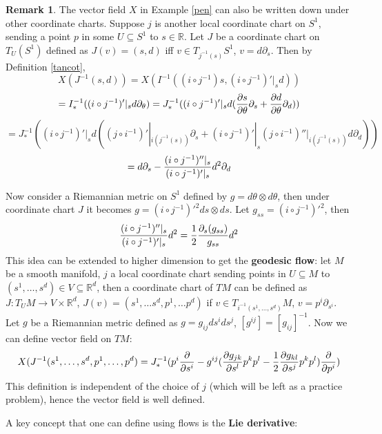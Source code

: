 \documentclass{article}
\theoremstyle{definition}
\newtheorem{rmk}[thm]{Remark}
\begin{document}
\begin{rmk}
    The vector field $X$ in Example \ref{pen} can also be written down under other coordinate charts. Suppose $j$ is another local coordinate chart on $S^1$, sending a point $p$ in some $U\subseteq S^1$ to $s\in \mathbb{R}$. Let $J$ be a coordinate chart on $T_U(S^1)$ defined as $J(v)=(s, d)$ iff $v\in T_{j^{-1}(s)}S^1$, $v=d\partial_s$. Then by Definition \ref{tancot},
    \[X(J^{-1}(s, d))=X(I^{-1}((i\circ j^{-1})s, (i\circ j^{-1})'|_s d))\]
    \[=I^{-1}_*((i\circ j^{-1})'|_s d\partial_\theta)=J^{-1}_*((i\circ j^{-1})'|_s d({\partial s\over\partial \theta}\partial_s+{\partial d\over\partial \theta}\partial_d))\]
    \[=J^{-1}_*((i\circ j^{-1})'|_s d((j\circ i^{-1})'|_{i(j^{-1}(s))}\partial_s+(i\circ j^{-1})'|_s (j\circ i^{-1})''|_{i(j^{-1}(s))}d\partial_d))\]
    \[=d\partial_s-{(i\circ j^{-1})''|_s\over (i\circ j^{-1})'|_s} d^2\partial_d\]

    Now consider a Riemannian metric on $S^1$ defined by $g=d\theta\otimes d\theta$, then under coordinate chart $J$ it becomes $g=(i\circ j^{-1})'^2 ds\otimes ds$. Let $g_{ss}=(i\circ j^{-1})'^2$, then 
    \[{(i\circ j^{-1})''|_s\over (i\circ j^{-1})'|_s} d^2={1\over 2}{\partial_s(g_{ss})\over g_{ss}}d^2\]
    This idea can be extended to higher dimension to get the {\bf geodesic flow}: let $M$ be a smooth manifold, $j$ a local coordinate chart sending points in $U\subseteq M$ to $(s^1, \dots, s^d)\in V\subseteq \mathbb{R}^d$, then a coordinate chart of $TM$ can be defined as $J: T_UM\rightarrow V\times\mathbb{R}^d$, $J(v)=(s^1, \dots s^d, p^1, \dots p^d)$ if $v\in T_{i^{-1}(s^1, \dots, s^d)}M$, $v=p^i\partial_{s^i}$. Let $g$ be a Riemannian metric defined as $g=g_{ij}ds^ids^j$, $[g^{ij}]=[g_{ij}]^{-1}$. Now we can define vector field on $TM$:
    \[X(J^{-1}(s^1,\dots, s^d, p^1,\dots, p^d)=J^{-1}_*(p^i{\partial\over \partial{s^i}}-g^{ij}({\partial g_{jk}\over\partial s^l}p^kp^l-{1\over 2}{\partial g_{kl}\over\partial s^j}p^kp^l){\partial\over \partial p^i})\]
    This definition is independent of the choice of $j$ (which will be left as a practice problem), hence the vector field is well defined.  
\end{rmk}

A key concept that one can define using flows is the {\bf Lie derivative}:
\end{document}
